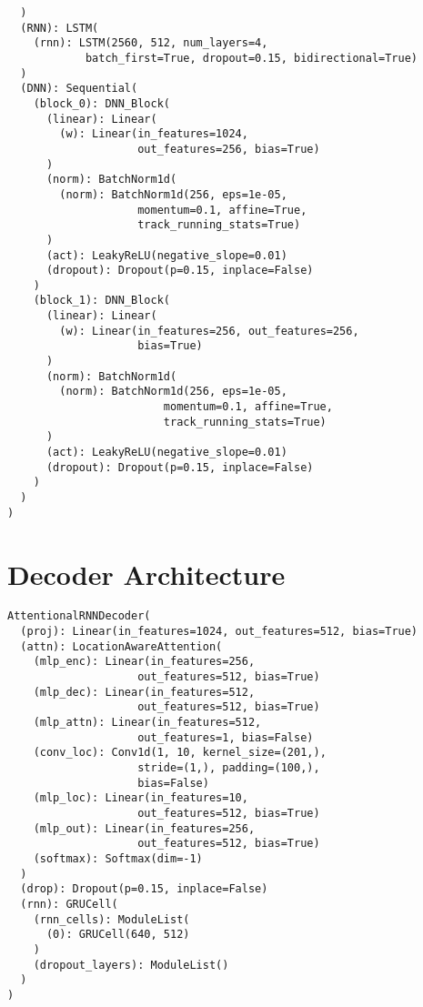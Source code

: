 \begin{verbatim}
  )
  (RNN): LSTM(
    (rnn): LSTM(2560, 512, num_layers=4, 
            batch_first=True, dropout=0.15, bidirectional=True)
  )
  (DNN): Sequential(
    (block_0): DNN_Block(
      (linear): Linear(
        (w): Linear(in_features=1024, 
                    out_features=256, bias=True)
      )
      (norm): BatchNorm1d(
        (norm): BatchNorm1d(256, eps=1e-05, 
                    momentum=0.1, affine=True, 
                    track_running_stats=True)
      )
      (act): LeakyReLU(negative_slope=0.01)
      (dropout): Dropout(p=0.15, inplace=False)
    )
    (block_1): DNN_Block(
      (linear): Linear(
        (w): Linear(in_features=256, out_features=256, 
                    bias=True)
      )
      (norm): BatchNorm1d(
        (norm): BatchNorm1d(256, eps=1e-05, 
                        momentum=0.1, affine=True, 
                        track_running_stats=True)
      )
      (act): LeakyReLU(negative_slope=0.01)
      (dropout): Dropout(p=0.15, inplace=False)
    )
  )
)
\end{verbatim}


\section{Decoder Architecture}

\begin{verbatim}
AttentionalRNNDecoder(
  (proj): Linear(in_features=1024, out_features=512, bias=True)
  (attn): LocationAwareAttention(
    (mlp_enc): Linear(in_features=256, 
                    out_features=512, bias=True)
    (mlp_dec): Linear(in_features=512,
                    out_features=512, bias=True)
    (mlp_attn): Linear(in_features=512, 
                    out_features=1, bias=False)
    (conv_loc): Conv1d(1, 10, kernel_size=(201,), 
                    stride=(1,), padding=(100,), 
                    bias=False)
    (mlp_loc): Linear(in_features=10, 
                    out_features=512, bias=True)
    (mlp_out): Linear(in_features=256, 
                    out_features=512, bias=True)
    (softmax): Softmax(dim=-1)
  )
  (drop): Dropout(p=0.15, inplace=False)
  (rnn): GRUCell(
    (rnn_cells): ModuleList(
      (0): GRUCell(640, 512)
    )
    (dropout_layers): ModuleList()
  )
)

\end{verbatim}